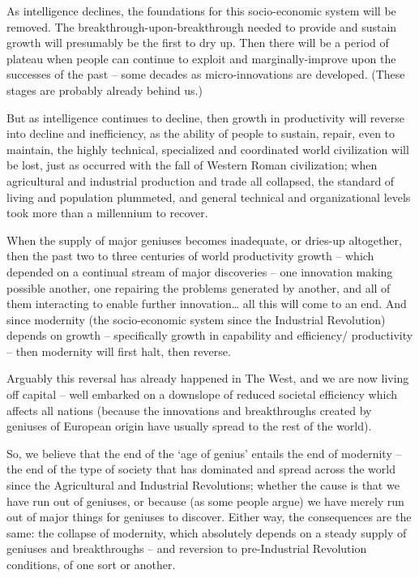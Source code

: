 \documentclass[
]{book}
\begin{document}
As intelligence declines, the foundations for this socio-economic system will be removed. The breakthrough-upon-breakthrough needed to provide and sustain growth will presumably be the first to dry up. Then there will be a period of plateau when people can continue to exploit and marginally-improve upon the successes of the past -- some decades as micro-innovations are developed. (These stages are probably already behind us.)

But as intelligence continues to decline, then growth in productivity will reverse into decline and inefficiency, as the ability of people to sustain, repair, even to maintain, the highly technical, specialized and coordinated world civilization will be lost, just as occurred with the fall of Western Roman civilization; when agricultural and industrial production and trade all collapsed, the standard of living and population plummeted, and general technical and organizational levels took more than a millennium to recover.

When the supply of major geniuses becomes inadequate, or dries-up altogether, then the past two to three centuries of world productivity growth -- which depended on a continual stream of major discoveries -- one innovation making possible another, one repairing the problems generated by another, and all of them interacting to enable further innovation\ldots{} all this will come to an end. And since modernity (the socio-economic system since the Industrial Revolution) depends on growth -- specifically growth in capability and efficiency/ productivity -- then modernity will first halt, then reverse.

Arguably this reversal has already happened in The West, and we are now living off capital -- well embarked on a downslope of reduced societal efficiency which affects all nations (because the innovations and breakthroughs created by geniuses of European origin have usually spread to the rest of the world).

So, we believe that the end of the `age of genius' entails the end of modernity -- the end of the type of society that has dominated and spread across the world since the Agricultural and Industrial Revolutions; whether the cause is that we have run out of geniuses, or because (as some people argue) we have merely run out of major things for geniuses to discover. Either way, the consequences are the same: the collapse of modernity, which absolutely depends on a steady supply of geniuses and breakthroughs -- and reversion to pre-Industrial Revolution conditions, of one sort or another.
\end{document}

